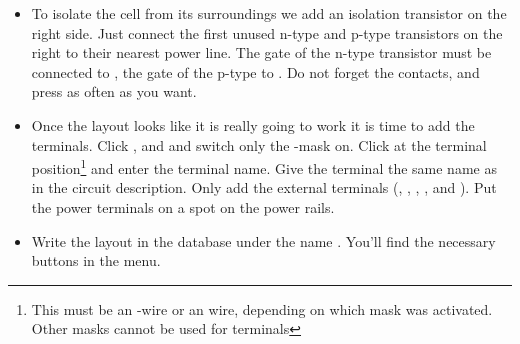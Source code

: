 \begin{itemize}
\item
To isolate the cell from its surroundings we add an isolation
transistor on the right side. Just connect the first unused n-type
and p-type transistors on the right to their nearest power line. The
gate of the n-type transistor must be connected to , the
gate of the p-type to .  Do not forget the contacts, and
press  as often as you want.

\item
Once the layout looks like it is really going to work it is time to add the
terminals. Click ,  and
 and switch only the -mask on. Click at the
terminal position\footnote{This must be an -wire or an 
wire, depending on which mask was activated. Other masks cannot be used for
terminals} and enter the terminal name. Give the terminal the same name as in
the circuit description. Only add the external terminals (, ,
, ,  and ). Put the power
terminals on a spot on the power rails.

\item
Write the layout in the database under the name . You'll
find the necessary buttons in the  menu.
\end{itemize}

